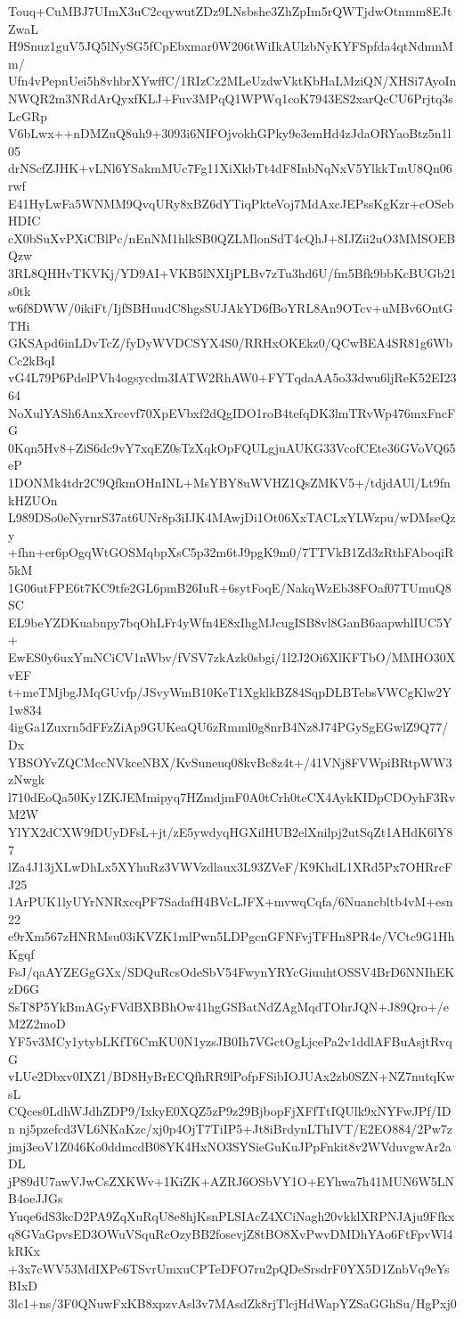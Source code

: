 Touq+CuMBJ7UImX3uC2cqywutZDz9LNsbshe3ZhZpIm5rQWTjdwOtnmm8EJtZwaL
H9Snuz1guV5JQ5lNySG5fCpEbxmar0W206tWiIkAUlzbNyKYFSpfda4qtNdmnMm/
Ufn4vPepnUei5h8vhbrXYwffC/1RIzCz2MLeUzdwVktKbHaLMziQN/XHSi7AyoIn
NWQR2m3NRdArQyxfKLJ+Fuv3MPqQ1WPWq1coK7943ES2xarQcCU6Prjtq3sLcGRp
V6bLwx++nDMZuQ8uh9+3093i6NIFOjvokhGPky9e3emHd4zJdaORYaoBtz5n1l05
drNScfZJHK+vLNl6YSakmMUc7Fg11XiXkbTt4dF8InbNqNxV5YlkkTmU8Qn06rwf
E41HyLwFa5WNMM9QvqURy8xBZ6dYTiqPkteVoj7MdAxcJEPssKgKzr+cOSebHDIC
cX0bSuXvPXiCBlPc/nEnNM1hlkSB0QZLMlonSdT4cQhJ+8IJZii2uO3MMSOEBQzw
3RL8QHHvTKVKj/YD9AI+VKB5lNXIjPLBv7zTu3hd6U/fm5Bfk9bbKcBUGb21s0tk
w6f8DWW/0ikiFt/IjfSBHuudC8hgsSUJAkYD6fBoYRL8An9OTcv+uMBv6OntGTHi
GKSApd6inLDvTcZ/fyDyWVDCSYX4S0/RRHxOKEkz0/QCwBEA4SR81g6WbCc2kBqI
vG4L79P6PdelPVh4ogsycdm3IATW2RhAW0+FYTqdaAA5o33dwu6ljReK52EI2364
NoXulYASh6AnxXrcevf70XpEVbxf2dQgIDO1roB4tefqDK3lmTRvWp476mxFncFG
0Kqn5Hv8+ZiS6dc9vY7xqEZ0sTzXqkOpFQULgjuAUKG33VcofCEte36GVoVQ65eP
1DONMk4tdr2C9QfkmOHnINL+MsYBY8uWVHZ1QsZMKV5+/tdjdAUl/Lt9fnkHZUOn
L989DSo0eNyrnrS37at6UNr8p3iIJK4MAwjDi1Ot06XxTACLxYLWzpu/wDMseQzy
+fhn+er6pOgqWtGOSMqbpXsC5p32m6tJ9pgK9m0/7TTVkB1Zd3zRthFAboqiR5kM
1G06utFPE6t7KC9tfe2GL6pmB26IuR+6sytFoqE/NakqWzEb38FOaf07TUmuQ8SC
EL9beYZDKuabnpy7bqOhLFr4yWfn4E8xIhgMJcugISB8vl8GanB6aapwhlIUC5Y+
EwES0y6uxYmNCiCV1nWbv/fVSV7zkAzk0sbgi/1l2J2Oi6XlKFTbO/MMHO30XvEF
t+meTMjbgJMqGUvfp/JSvyWmB10KeT1XgklkBZ84SqpDLBTebsVWCgKlw2Y1w834
4igGa1Zuxrn5dFFzZiAp9GUKeaQU6zRmml0g8nrB4Nz8J74PGySgEGwlZ9Q77/Dx
YBSOYvZQCMccNVkceNBX/KvSuneuq08kvBc8z4t+/41VNj8FVWpiBRtpWW3zNwgk
l710dEoQa50Ky1ZKJEMmipyq7HZmdjmF0A0tCrh0teCX4AykKIDpCDOyhF3RvM2W
YlYX2dCXW9fDUyDFsL+jt/zE5ywdyqHGXilHUB2elXnilpj2utSqZt1AHdK6lY87
lZa4J13jXLwDhLx5XYhuRz3VWVzdlaux3L93ZVeF/K9KhdL1XRd5Px7OHRrcFJ25
1ArPUK1lyUYrNNRxcqPF7SadafH4BVcLJFX+mvwqCqfa/6Nuancbltb4vM+esn22
e9rXm567zHNRMsu03iKVZK1mlPwn5LDPgcnGFNFvjTFHn8PR4e/VCtc9G1HhKgqf
FsJ/qaAYZEGgGXx/SDQuRcsOdeSbV54FwynYRYcGiuuhtOSSV4BrD6NNIhEKzD6G
SsT8P5YkBmAGyFVdBXBBhOw41hgGSBatNdZAgMqdTOhrJQN+J89Qro+/eM2Z2moD
YF5v3MCy1ytybLKfT6CmKU0N1yzsJB0Ih7VGctOgLjcePa2v1ddlAFBuAsjtRvqG
vLUe2Dbxv0IXZ1/BD8HyBrECQfhRR9lPofpFSibIOJUAx2zb0SZN+NZ7nutqKwsL
CQces0LdhWJdhZDP9/IxkyE0XQZ5zP9z29BjbopFjXFfTtIQUlk9xNYFwJPf/IDn
nj5pzefcd3VL6NKaKzc/xj0p4OjT7TiIP5+Jt8iBrdynLThIVT/E2EO884/2Pw7z
jmj3eoV1Z046Ko0ddmcdB08YK4HxNO3SYSieGuKuJPpFnkit8v2WVduvgwAr2aDL
jP89dU7awVJwCsZXKWv+1KiZK+AZRJ6OSbVY1O+EYhwa7h41MUN6W5LNB4oeJJGs
Yuqe6dS3kcD2PA9ZqXuRqU8e8hjKsnPLSIAcZ4XCiNagh20vkklXRPNJAju9Ffkx
q8GVaGpvsED3OWuVSquRcOzyBB2fosevjZ8tBO8XvPwvDMDhYAo6FtFpvWl4kRKx
+3x7cWV53MdIXPe6TSvrUmxuCPTeDFO7ru2pQDeSrsdrF0YX5D1ZnbVq9eYsBIxD
3lc1+ns/3F0QNuwFxKB8xpzvAsl3v7MAsdZk8rjTlcjHdWapYZSaGGhSu/HgPxj0
